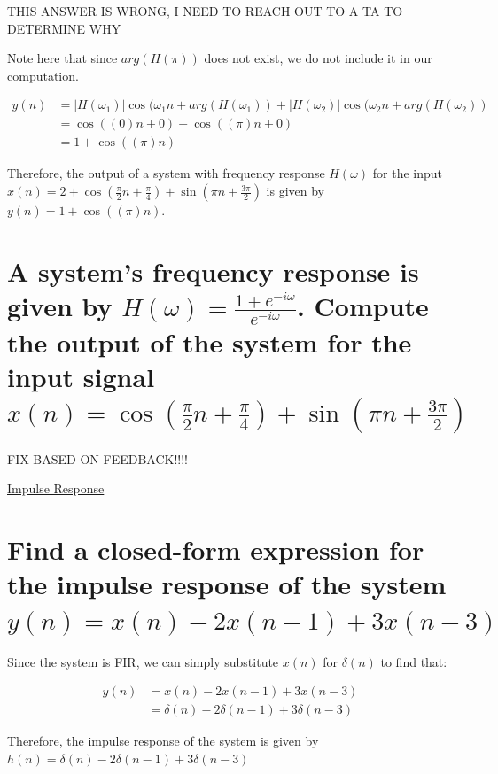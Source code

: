 \documentclass{article}
\newenvironment{directsubsubs}{
  \makeatletter
  \renewcommand\thesubsubsection{\thesection.\Roman{subsubsection}}
  \makeatother
}{
  \makeatletter
  \renewcommand\thesubsubsection{\thesubsection.\Roman{subsubsection}}
  \makeatother
}
\renewcommand{\thesubsection}{\thesection.\alph{subsection}}
\renewcommand{\thesubsubsection}{\thesection.\alph{subsection}.\Roman{subsubsection}}
\begin{document}
\begin{directsubsubs}
THIS ANSWER IS WRONG, I NEED TO REACH OUT TO A TA TO DETERMINE WHY

Note here that since $arg(H(\pi))$ does not exist, we do not include it in our computation.

\begin{align*}
	y(n) &= |H(\omega_1)|\cos{({\omega_1}n + arg(H(\omega_1))} + |H(\omega_2)|\cos{({\omega_2}n + arg(H(\omega_2))} \\
	&= \cos{((0)n + 0)} + \cos{((\pi)n + 0)} \\
	&= 1 + \cos{((\pi)n)}
\end{align*}

Therefore, the output of a system with frequency response $H(\omega)$ for the input $x(n) = 2 + \cos{(\frac{\pi}{2}n + \frac{\pi}{4})} + \sin{({\pi}n + \frac{3\pi}{2})}$ is given by $y(n) = 1 + \cos{((\pi)n)}$.

\section[Question ~\thesection]{A system's frequency response is given by $H(\omega) = \frac{1 + e^{-i{\omega}}}{e^{-i{\omega}}}$. Compute the output of the system for the input signal $x(n) = \cos{(\frac{\pi}{2}n + \frac{\pi}{4})} + \sin{({\pi}n + \frac{3\pi}{2})}$}

FIX BASED ON FEEDBACK!!!!

\end{directsubsubs}

\newpage

\begin{center}
	\Large{\underline{Impulse Response}}
\end{center}

\section[Question ~\thesection]{Find a closed-form expression for the impulse response of the system $y(n) = x(n) - 2x(n - 1) + 3x(n - 3)$}

Since the system is FIR, we can simply substitute $x(n)$ for $\delta(n)$ to find that:

\begin{align*}
	y(n) &= x(n) - 2x(n - 1) + 3x(n - 3) \\
	&= \delta(n) - 2\delta(n - 1) + 3\delta(n - 3)
\end{align*}

Therefore, the impulse response of the system is given by $h(n) = \delta(n) - 2\delta(n - 1) + 3\delta(n - 3)$
\end{document}
